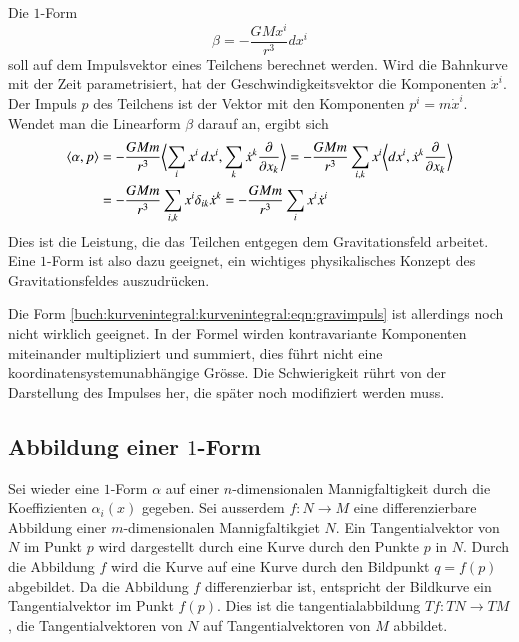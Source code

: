 \begin{beispiel}
Die $1$-Form
\[
\beta
=
-
\frac{GMx^i}{r^3}
dx^i
\]
soll auf dem Impulsvektor eines Teilchens berechnet werden.
%
Wird die Bahnkurve mit der Zeit parametrisiert, hat der Geschwindigkeitsvektor
die Komponenten $\dot{x}^i$.
Der Impuls $p$ des Teilchens ist der Vektor mit den Komponenten
$p^i=m\dot{x}^i$.
Wendet man die Linearform $\beta$ darauf an, ergibt sich
\begin{align*}
\langle \alpha, p\rangle
&=
-
\frac{GMm}{r^3}
\biggl\langle \sum_i x^i\,dx^i, \sum_k\dot{x}^k\frac{\partial}{\partial x_k}\biggr\rangle
=
-
\frac{GMm}{r^3}
\sum_{i,k} x^i \biggl\langle dx^i,\dot{x}^k\frac{\partial}{\partial x_k}\biggr\rangle
\notag
\\
&=
-
\frac{GMm}{r^3}
\sum_{i,k}
x^i \delta_{ik} \dot{x}^k
=
-\frac{GMm}{r^3}
\sum_i x^i\dot{x}^i
\label{buch:kurvenintegral:kurvenintegral:eqn:gravimpuls}
\end{align*}
Dies ist die Leistung, die das Teilchen entgegen dem Gravitationsfeld 
arbeitet.
Eine $1$-Form ist also dazu geeignet, ein wichtiges physikalisches Konzept
des Gravitationsfeldes auszudrücken.

Die Form
\eqref{buch:kurvenintegral:kurvenintegral:eqn:gravimpuls}
ist allerdings noch nicht wirklich geeignet.
In der Formel wirden kontravariante Komponenten miteinander multipliziert
und summiert, dies führt nicht eine koordinatensystemunabhängige
Grösse.
Die Schwierigkeit rührt von der Darstellung des Impulses her, die später
noch modifiziert werden muss.
\end{beispiel}

%
%
\subsection{Abbildung einer $1$-Form}
Sei wieder eine $1$-Form $\alpha$ auf einer $n$-dimensionalen Mannigfaltigkeit
durch die Koeffizienten $\alpha_i(x)$ gegeben.
Sei ausserdem $f\colon N\to M$ eine differenzierbare Abbildung einer
$m$-dimensionalen Mannigfaltikgiet $N$.
Ein Tangentialvektor von $N$ im Punkt $p$ wird dargestellt durch eine
Kurve durch den Punkte $p$ in $N$.
Durch die Abbildung $f$ wird die Kurve auf eine Kurve durch den Bildpunkt
$q=f(p)$ abgebildet.
Da die Abbildung $f$ differenzierbar ist, entspricht der Bildkurve 
ein Tangentialvektor im Punkt $f(p)$.
Dies ist die tangentialabbildung $Tf\colon TN\to TM$, die Tangentialvektoren
von $N$ auf Tangentialvektoren von $M$ abbildet.

